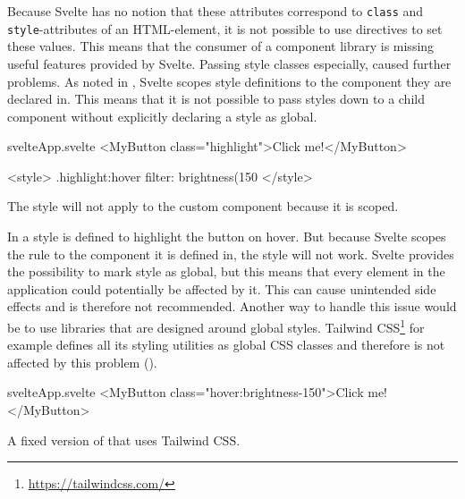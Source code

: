 Because Svelte has no notion that these attributes correspond to \texttt{class} and \texttt{style}-attributes of an HTML-element, it is not possible to use directives to set these values. This means that the consumer of a component library is missing useful features provided by Svelte. Passing style classes especially, caused further problems. As noted in , Svelte scopes style definitions to the component they are declared in. This means that it is not possible to pass styles down to a child component without explicitly declaring a style as global.

\begin{listing}[H]
\begin{myminted}{svelte}{App.svelte}
<MyButton class="highlight">Click me!</MyButton>

<style>
  .highlight:hover {
    filter: brightness(150%
  }
</style>
\end{myminted}
\caption{The style will not apply to the custom component because it is scoped.}
\label{fig:evaluation-styling-scope}
\end{listing}

In  a style is defined to highlight the button on hover. But because Svelte scopes the rule to the component it is defined in, the style will not work. Svelte provides the possibility to mark style as global, but this means that every element in the application could potentially be affected by it. This can cause unintended side effects and is therefore not recommended. Another way to handle this issue would be to use libraries that are designed around global styles. Tailwind CSS\footnote{\url{https://tailwindcss.com/}} for example defines all its styling utilities as global CSS classes and therefore is not affected by this problem ().

\begin{listing}[H]
\begin{myminted}{svelte}{App.svelte}
  <MyButton class="hover:brightness-150">Click me!</MyButton>
\end{myminted}
\caption{A fixed version of  that uses Tailwind CSS.}
\label{fig:evaluation-styling-tailwind}
\end{listing}





